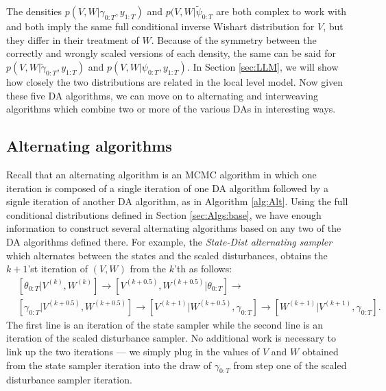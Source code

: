\documentclass{article}
\begin{document}
The densities $p(V,W|\gamma_{0:T},y_{1:T})$ and $p(V,W|\tilde{\psi}_{0:T}$ are both complex to work with and both imply the same full conditional inverse Wishart distribution for $V$, but they differ in their treatment of $W$. Because of the symmetry between the correctly and wrongly scaled versions of each density, the same can be said for $p(V,W|\tilde{\gamma}_{0:T},y_{1:T})$ and $p(V,W|\psi_{0:T},y_{1:T})$. In Section \ref{sec:LLM}, we will show how closely the two distributions are related in the local level model. Now given these five DA algorithms, we can move on to alternating and interweaving algorithms which combine two or more of the various DAs in interesting ways.

\subsection{Alternating algorithms}\label{sec:Algs:alt}
Recall that an alternating algorithm is an MCMC algorithm in which one iteration is composed of a single iteration of one DA algorithm followed by a signle iteration of another DA algorithm, as in Algorithm \ref{alg:Alt}. Using the full conditional distributions defined in Section \ref{sec:Algs:base}, we have enough information to construct several alternating algorithms based on any two of the DA algorithms defined there. For example, the {\it State-Dist alternating sampler} which alternates between the states and the scaled disturbances, obtains the $k+1$'st iteration of $(V,W)$ from the $k$'th as follows:
\begin{align*}
&[\theta_{0:T}|V^{(k)},W^{(k)}] \to [V^{(k+0.5)},W^{(k+0.5)}|\theta_{0:T}] \to\\ 
&
[\gamma_{0:T}|V^{(k+0.5)},W^{(k+0.5)}] \to [V^{(k+1)}|W^{(k+0.5)},\gamma_{0:T}] \to [W^{(k+1)}|V^{(k+1)},\gamma_{0:T}].
\end{align*}
The first line is an iteration of the state sampler while the second line is an iteration of the scaled disturbance sampler. No additional work is necessary to link up the two iterations --- we simply plug in the values of $V$ and $W$ obtained from the state sampler iteration into the draw of $\gamma_{0:T}$ from step one of the scaled disturbance sampler iteration.
\end{document}
